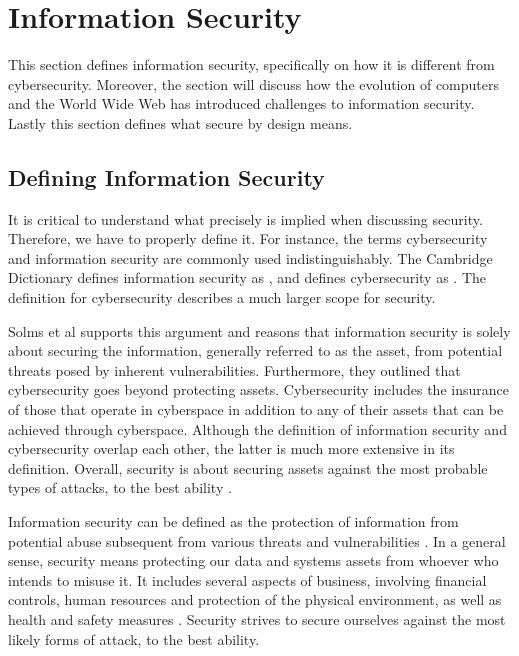 \section{Information Security}
This section defines information security, specifically on how it is different from cybersecurity. Moreover, the section will discuss how the evolution of computers and the World Wide Web has introduced challenges to information security. Lastly this section defines what secure by design means.

\subsection{Defining Information Security}
It is critical to understand what precisely is implied when discussing security. Therefore, we have to properly define it. For instance, the terms cybersecurity and information security are commonly used indistinguishably. The Cambridge Dictionary defines information security as , and defines cybersecurity as . The definition for cybersecurity describes a much larger scope for security. 

Solms et al \cite{von_Solms_2013} supports this argument and reasons that information security is solely about securing the information, generally referred to as the asset, from potential threats posed by inherent vulnerabilities. Furthermore, they outlined that cybersecurity goes beyond protecting assets. Cybersecurity includes the insurance of those that operate in cyberspace in addition to any of their assets that can be achieved through cyberspace. Although the definition of information security and cybersecurity overlap each other, the latter is much more extensive in its definition. Overall, security is about securing assets against the most probable types of attacks, to the best ability \cite{andress2014the}.

Information security can be defined as the protection of information from potential abuse subsequent from various threats and vulnerabilities \cite{von_Solms_2013}. In a general sense, security means protecting our data and systems assets from whoever who intends to misuse it. It includes several aspects of business, involving financial controls, human resources and protection of the physical environment, as well as health and safety measures \cite{zinatullin2016the}. Security strives to secure ourselves against the most likely forms of attack, to the best ability.

